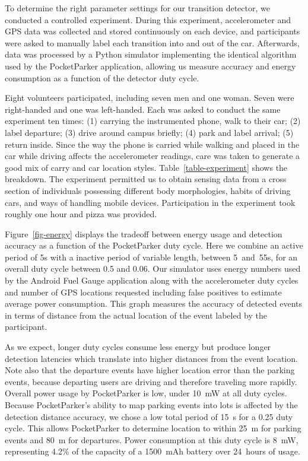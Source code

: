 

To determine the right parameter settings for our transition detector, we
conducted a controlled experiment. During this experiment, accelerometer and
GPS data was collected and stored continuously on each device, and
participants were asked to manually label each transition into and out of the
car. Afterwards, data was processed by a Python simulator implementing the
identical algorithm used by the PocketParker application, allowing us measure
accuracy and energy consumption as a function of the detector duty cycle.

Eight volunteers participated, including seven men and one woman. Seven were
right-handed and one was left-handed. Each was asked to conduct the same
experiment ten times: (1) carrying the instrumented phone, walk to their car;
(2) label departure; (3) drive around campus briefly; (4) park and label
arrival; (5) return inside. Since the way the phone is carried while walking
and placed in the car while driving affects the accelerometer readings, care
was taken to generate a good mix of carry and car location styles.
Table~\ref{table-experiment} shows the breakdown. The experiment permitted us
to obtain sensing data from a cross section of individuals possessing
different body morphologies, habits of driving cars, and ways of handling
mobile devices. Participation in the experiment took roughly one hour and
pizza was provided.

Figure~\ref{fig-energy} displays the tradeoff between energy usage and
detection accuracy as a function of the PocketParker duty cycle. Here we
combine an active period of 5s with a inactive period of variable length,
between 5~and~55s, for an overall duty cycle between 0.5 and 0.06. Our
simulator uses energy numbers used by the Android Fuel Gauge application
along with the accelerometer duty cycles and number of GPS locations
requested including false positives to estimate average power consumption.
This graph measures the accuracy of detected events in terms of distance from
the actual location of the event labeled by the participant.

As we expect, longer duty cycles consume less energy but produce longer
detection latencies which translate into higher distances from the event
location. Note also that the departure events have higher location error than
the parking events, because departing users are driving and therefore
traveling more rapidly. Overall power usage by PocketParker is low, under
10~mW at all duty cycles. Because PocketParker's ability to map parking
events into lots is affected by the detection distance accuracy, we chose a
low total period of 15~s for a 0.25 duty cycle. This allows PocketParker to
determine location to within 25~m for parking events and 80~m for departures.
Power consumption at this duty cycle is 8~mW, representing 4.2\% of the
capacity of a 1500~mAh battery over 24~hours of usage.

